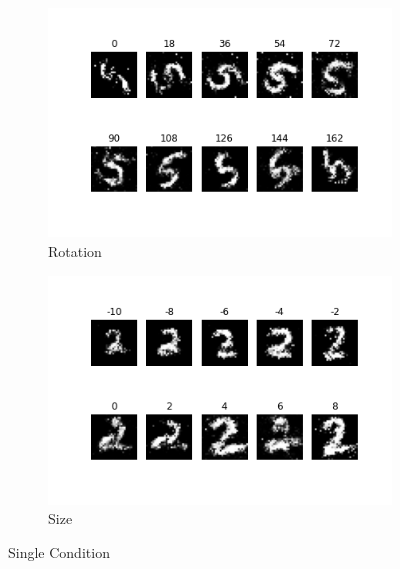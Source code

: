 \documentclass[11pt, letterpaper, oneside]{article}
\begin{document}
\begin{figure}
    \begin{subfigure}{.5\textwidth}
      \centering
      \includegraphics[width=1\linewidth]{rotation.png}  
      \caption{Rotation}
      \label{fig:sub-third}
    \end{subfigure}
    \begin{subfigure}{.5\textwidth}
      \centering
      \includegraphics[width=1\linewidth]{size.png}
      \caption{Size}
      \label{fig:sub-fourth}
    \end{subfigure}
\caption{Single Condition}
\label{fig:fig}
\end{figure}
  
\end{document}
